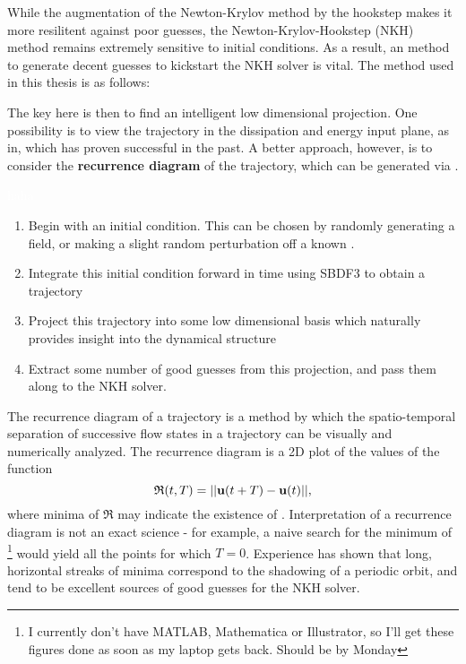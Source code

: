 While the augmentation of the Newton-Krylov method by the hookstep makes it more resilitent against poor guesses, the Newton-Krylov-Hookstep (NKH) method remains extremely sensitive to initial conditions. As a result, an method to generate decent guesses to kickstart the NKH solver is vital. The method used in this thesis is as follows:

 The key here is then to find an intelligent low dimensional projection. One possibility is to view the trajectory in the dissipation and energy input plane, as in, which has proven successful in the past. A better approach, however, is to consider the {\bf recurrence diagram} of the trajectory, which can be generated via . \\
 
  \begin{algorithm}\label{alg:rec}
  \textcolor{white}{haha}
 \begin{enumerate}
 \item Begin with an initial condition. This can be chosen by randomly generating a field, or making a slight random perturbation off a known \ecs.
 \item Integrate this initial condition forward in time using SBDF3 to obtain a trajectory 
 \item Project this trajectory into some low dimensional basis which naturally provides insight into the dynamical structure
 \item Extract some number of good guesses from this projection, and pass them along to the NKH solver.
 \end{enumerate}
 \end{algorithm} 
 The recurrence diagram of a trajectory is a method by which the spatio-temporal separation of successive flow states in a trajectory can be visually and numerically analyzed. The recurrence diagram is a 2D plot of the values of the function 
 \begin{equation}\label{eq:recurrenceEQ}
 \mathfrak{R}(t,T) = ||\mathbf{u}(t+T) - \mathbf{u}(t)||,
 \end{equation}
 where minima of $\mathfrak{R}$ may indicate the existence of \ecs. Interpretation of a recurrence diagram is not an exact science - for example, a naive search for the minimum of \footnote{I currently don't have MATLAB, Mathematica or Illustrator, so I'll get these figures done as soon as my laptop gets back. Should be by Monday} would yield all the points for which $T=0$. Experience has shown that long, horizontal streaks of minima correspond to the shadowing of a periodic orbit, and tend to be excellent sources of good guesses for the NKH solver. \\
 
